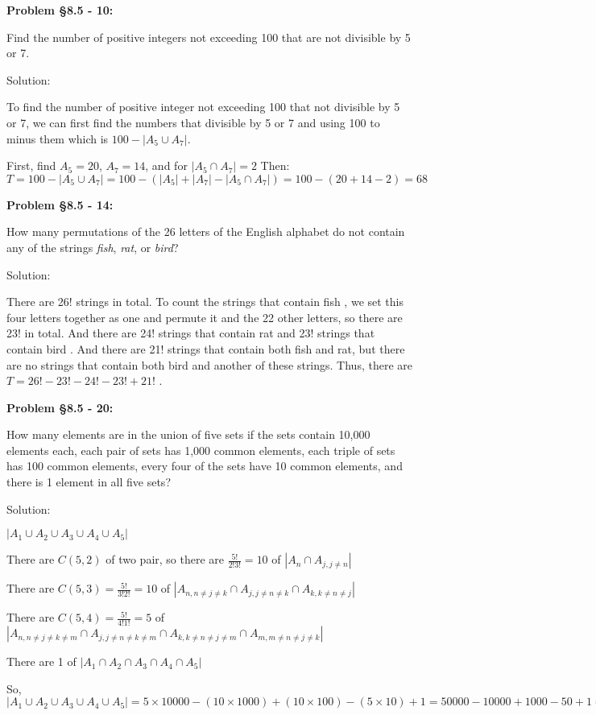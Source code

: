 \documentclass{article}
\newenvironment{problem}[1]
    {\begin{mdframed}[default]
    \textbf{Problem #1:}
    }
    {\end{mdframed}
    }
\begin{document}
\begin{problem}{\S 8.5 - 10}
Find the number of positive integers not exceeding 100 that are not divisible by 5 or 7.

Solution:

To find the number of positive integer not exceeding 100 that not divisible by 5 or 7, we can first find the numbers that divisible by 5 or 7 and using 100 to minus them
which is $100-|A_5\cup A_7|$.

First, find $A_5=20$, $A_7=14$, and for $|A_5\cap A_7|=2$
Then: $T=100-|A_5\cup A_7|=100-(|A_5|+|A_7|-|A_5 \cap A_7|)=100-(20+14-2)=68$

\end{problem}

\begin{problem}{\S 8.5 - 14}
How many permutations of the 26 letters of the English alphabet do not contain any of the strings \emph{fish}, \emph{rat}, or \emph{bird}?

Solution:

There are 26! strings in total. To count the strings that contain fish , we set this four letters together as one
and permute it and the 22 other letters, so there are 23! in total. And there are 24! strings that
contain rat and 23! strings that contain bird . And there are 21! strings that contain both fish and
rat, but there are no strings that contain both bird and another
of these strings. Thus, there are $T=26! - 23! - 24! - 23! + 21!$
.
\end{problem}

\begin{problem}{\S 8.5 - 20}
How many elements are in the union of five sets if the sets contain 10,000 elements each, each pair of sets has 1,000 common elements, each triple of sets has 100 common elements, every four of the sets have 10 common elements, and there is 1 element in all five sets?

Solution:

$|A_1\cup A_2\cup A_3\cup A_4\cup A_5|$

There are $C(5,2)$ of two pair, so there are $\frac{5!}{2!3!}=10$ of $|A_n\cap A_{j, j\neq n}|$

There are $C(5,3)=\frac{5!}{3!2!}=10$ of $|A_{n,n\neq j\neq k}\cap A_{j,j\neq n \neq k} \cap A_{k,k\neq n\neq j}|$

There are $C(5,4)=\frac{5!}{4!1!}=5$ of $|A_{n,n\neq j\neq k\neq m}\cap A_{j,j\neq n \neq k\neq m} \cap A_{k,k\neq n\neq j\neq m}\cap A_{m, m\neq n\neq j\neq k}|$

There are 1 of $|A_1\cap A_2\cap A_3\cap A_4\cap A_5|$

So, $|A_1\cup A_2\cup A_3\cup A_4\cup A_5|=5\times 10000-(10\times 1000)+(10\times 100)-(5\times 10)+1=50000-10000+1000-50+1=40951$
\end{problem}
\end{document}
